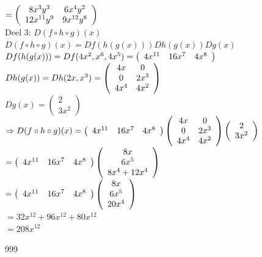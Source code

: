 \documentclass[a4paper]{article}
\begin{document}
$= \left(\begin{array}{c c} 8x^3y^3 & 6x^4y^2 \\ 12x^{11}y^9 & 9x^{12}y^8 \end{array}\right)$\\

Deel 3: $D(f \circ h \circ g)(x)$\\

$D(f \circ h \circ g)(x) = Df(h(g(x)))   Dh(g(x))   Dg(x)$\\

$Df(h(g(x))) = Df(4x^2, x^6, 4x^5) = \left(\begin{array}{c c c} 4x^{11} & 16x^7 & 4x^8 \end{array}\right)$\\

$Dh(g(x)) = Dh(2x, x^3) = \left(\begin{array}{c c} 4x & 0 \\ 0 & 2x^3 \\ 4x^4 & 4x^2 \end{array}\right)$\\

$Dg(x) = \left(\begin{array}{c} 2 \\ 3x^2 \end{array}\right)$\\

$\Rightarrow D(f \circ h \circ g)(x) = \left(\begin{array}{c c c} 4x^{11} & 16x^7 & 4x^8 \end{array}\right)   \left(\begin{array}{c c} 4x & 0 \\ 0 & 2x^3 \\ 4x^4 & 4x^2 \end{array}\right)   \left(\begin{array}{c} 2 \\ 3x^2 \end{array}\right)$\\

$= \left(\begin{array}{c c c} 4x^{11} & 16x^7 & 4x^8 \end{array}\right)   \left(\begin{array}{c} 8x \\ 6x^5 \\ 8x^4 + 12x^4 \end{array}\right)$\\

$= \left(\begin{array}{c c c} 4x^{11} & 16x^7 & 4x^8 \end{array}\right)   \left(\begin{array}{c} 8x \\ 6x^5 \\ 20x^4 \end{array}\right)$\\

$= 32x^{12} + 96x^{12} + 80x^{12}$\\

$= 208x^{12}$\\

\begin{thebibliography}{999}
\end{thebibliography}
\end{document}
